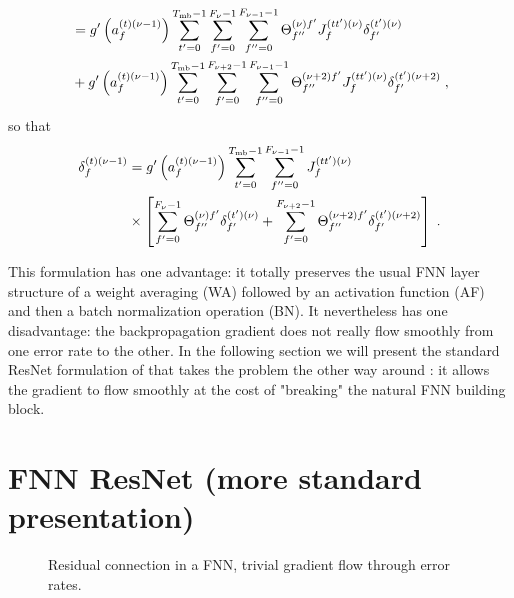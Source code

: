 \begin{subappendices}
\begin{align}
%
&=g'\left(a_{f}^{(t)(\nu-1)}\right)
%
\sum_{t'=0}^{T_{{\rm mb}}-1}\sum_{f'=0}^{F_{\nu}-1}\sum^{F_{\nu-1}-1}_{f''=0}\Theta^{(\nu)f'}_{f''}
%
J^{(tt')(\nu)}_{f} \delta^{(t')(\nu)}_{f'}\notag\\
%
&+g'\left(a_{f}^{(t)(\nu-1)}\right)
%
\sum_{t'=0}^{T_{{\rm mb}}-1}\sum_{f'=0}^{F_{\nu+2}-1}\sum^{F_{\nu-1}-1}_{f''=0}\Theta^{(\nu+2)f'}_{f''}
%
J^{(tt')(\nu)}_{f} \delta^{(t')(\nu+2)}_{f'}\;,
\end{align}
so that
\begin{align}
\delta^{(t)(\nu-1)}_f&=g'\left(a_{f}^{(t)(\nu-1)}\right)
%
\sum_{t'=0}^{T_{{\rm mb}}-1}\sum^{F_{\nu-1}-1}_{f''=0}J^{(tt')(\nu)}_{f}\notag\\
%
&\times\left[\sum_{f'=0}^{F_{\nu}-1}\Theta^{(\nu)f'}_{f''}\delta^{(t')(\nu)}_{f'}+
%
\sum_{f'=0}^{F_{\nu+2}-1}\Theta^{(\nu+2)f'}_{f''}\delta^{(t')(\nu+2)}_{f'}\right]\;.
\end{align}

This formulation has one advantage: it totally preserves the usual FNN layer structure of a weight averaging (WA) followed by an activation function (AF) and then a batch normalization operation (BN). It nevertheless has one disadvantage: the backpropagation gradient does not really flow smoothly from one error rate to the other. In the following section we will present the standard ResNet formulation of that takes the problem the other way around : it allows the gradient to flow smoothly at the cost of "breaking" the natural FNN building block.

\section{FNN ResNet (more standard presentation)} \label{sec:ResnetFNN2}

\begin{figure}[H]
\begin{center}
\end{center}
\caption{\label{fig:fc_resnet_3} Residual connection in a FNN, trivial gradient flow through error rates.}
\end{figure}


\end{subappendices}

